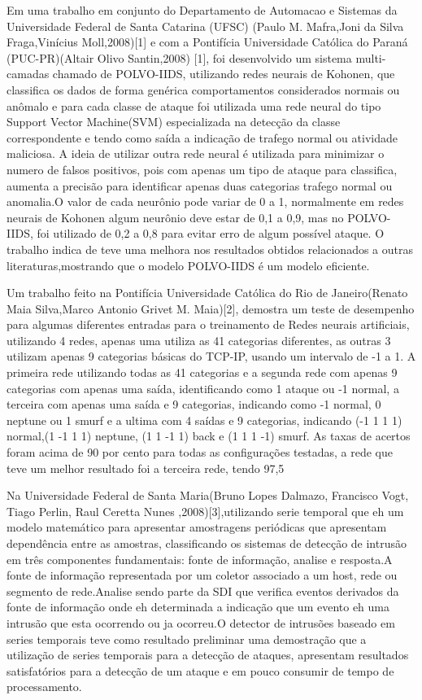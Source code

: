 \documentclass[
	12pt,				%
	openright,			%
	oneside,
	a4paper,			%
	english,			%
	french,				%
	spanish,			%
	brazil				%
	]{abntex2}
\begin{document}
Em uma trabalho em conjunto do Departamento de Automacao e Sistemas da Universidade Federal de Santa Catarina (UFSC) 
(Paulo M. Mafra,Joni da Silva Fraga,Vinícius Moll,2008)[1] e com a Pontifícia Universidade Católica do Paraná (PUC-PR)(Altair Olivo Santin,2008)
[1], foi desenvolvido um sistema multi-camadas chamado de POLVO-IIDS, utilizando redes neurais de Kohonen, que classifica os dados de forma
genérica comportamentos considerados normais ou anômalo e para cada classe de ataque foi utilizada uma
rede neural do tipo Support Vector Machine(SVM) especializada na detecção da classe correspondente e tendo como saída a indicação de trafego normal ou atividade maliciosa.
A ideia de utilizar outra rede neural é utilizada para minimizar o numero de falsos positivos, pois com apenas um tipo de ataque para classifica, aumenta a precisão para identificar 
apenas duas categorias trafego normal ou anomalia.O valor de cada neurônio pode variar de 0 a 1, normalmente em redes neurais de Kohonen algum neurônio deve estar de 0,1 a 0,9,
mas no POLVO-IIDS, foi utilizado de 0,2 a 0,8 para evitar erro de algum possível ataque. O trabalho indica de teve uma melhora nos resultados obtidos relacionados a outras literaturas,mostrando que o modelo POLVO-IIDS é um modelo eficiente.

Um trabalho feito na Pontifícia Universidade Católica do Rio de Janeiro(Renato Maia Silva,Marco Antonio Grivet M. Maia)[2], demostra um teste de desempenho para algumas diferentes entradas para o treinamento de Redes neurais artificiais,
utilizando 4 redes, apenas uma utiliza as 41 categorias diferentes, as outras 3 utilizam apenas 9 categorias básicas do TCP-IP, usando um intervalo de -1 a 1. A primeira rede utilizando todas as 41 categorias e a segunda rede com apenas 9 categorias com apenas uma saída, identificando como 1 ataque ou -1 normal, a terceira com apenas uma saída e 9 categorias, indicando como -1 normal, 0 neptune ou 1 smurf e a ultima com 4 saídas e 9 categorias, indicando (-1 1 1 1) normal,(1 -1 1 1) neptune, (1 1 -1 1) back e (1 1 1 -1) smurf. As taxas de acertos foram acima de 90 por cento para todas as configurações testadas, a rede que teve um melhor resultado foi a terceira rede, tendo 97,5%

Na Universidade Federal de Santa Maria(Bruno Lopes Dalmazo, Francisco Vogt, Tiago Perlin, Raul Ceretta Nunes ,2008)[3],utilizando serie temporal que eh um modelo matemático para apresentar amostragens periódicas que apresentam dependência entre as amostras, classificando os sistemas de detecção de intrusão em três componentes fundamentais: fonte de informação, analise e resposta.A fonte de informação representada por um coletor associado a um host, rede ou segmento de rede.Analise sendo parte da SDI que verifica eventos derivados da fonte de informação onde eh determinada a indicação que um evento eh uma intrusão que esta ocorrendo ou ja ocorreu.O detector de intrusões baseado em series temporais teve como resultado preliminar uma demostração que a utilização de series temporais para a detecção de ataques, apresentam resultados satisfatórios para a detecção de um ataque e em pouco consumir de tempo de processamento.
\end{document}
